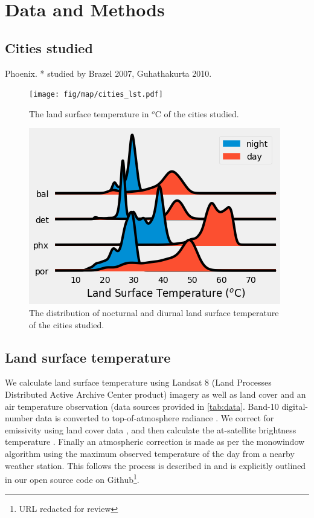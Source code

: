 \documentclass[]{elsarticle}
\begin{document}
\section{Data and Methods}
\subsection{Cities studied}

Phoenix.
* studied by Brazel 2007, Guhathakurta 2010.

\begin{figure}[h]
\begin{center}
\texttt{[image: fig/map/cities\_lst.pdf]}
\caption{The land surface temperature in $^o$C of the cities studied.}
\label{fig:cities}
\end{center}
\end{figure}

\begin{figure}[H]
    \centering
    \includegraphics[width=\linewidth]{fig/report/joyplot_lst.png}
    \caption{The distribution of nocturnal and diurnal land surface temperature of the cities studied.}
    \label{fig:joy}
\end{figure}

\subsection{Land surface temperature}
We calculate land surface temperature using Landsat 8 (Land Processes Distributed Active Archive Center product) imagery as well as land cover and an air temperature observation (data sources provided in \ref{tab:data}. Band-10 digital-number data is converted to top-of-atmosphere radiance \cite{Jimenez-Munoz2003-wc}. We correct for emissivity using land cover data \cite{Alipour2003-gb}, and then calculate the at-satellite brightness temperature \cite{Jimenez-Munoz2003-wc}. Finally an atmospheric correction is made as per the monowindow algorithm \cite{Qin2001-jn} using the maximum observed temperature of the day from a nearby weather station. This follows the process is described in \cite{Scott2016-lc} and is explicitly outlined in our open source code on Github\footnote{URL redacted for review}. 
\end{document}
